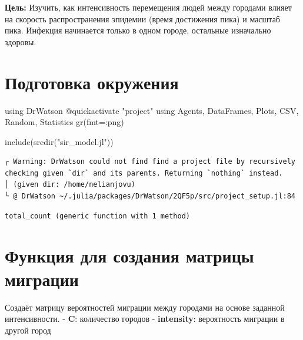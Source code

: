 \documentclass[
  12pt,
  a4paper,
  DIV=11,
  numbers=noendperiod]{scrreprt}
\newenvironment{Shaded}{\begin{snugshade}}{\end{snugshade}}
\newcommand{\BuiltInTok}[1]{\textcolor[rgb]{0.00,0.23,0.31}{#1}}
\newcommand{\FunctionTok}[1]{\textcolor[rgb]{0.28,0.35,0.67}{#1}}
\newcommand{\ImportTok}[1]{\textcolor[rgb]{0.00,0.46,0.62}{#1}}
\newcommand{\NormalTok}[1]{\textcolor[rgb]{0.00,0.23,0.31}{#1}}
\newcommand{\OperatorTok}[1]{\textcolor[rgb]{0.37,0.37,0.37}{#1}}
\newcommand{\PreprocessorTok}[1]{\textcolor[rgb]{0.68,0.00,0.00}{#1}}
\newcommand{\StringTok}[1]{\textcolor[rgb]{0.13,0.47,0.30}{#1}}
\begin{document}
\textbf{Цель:} Изучить, как интенсивность перемещения людей между
городами влияет на скорость распространения эпидемии (время достижения
пика) и масштаб пика. Инфекция начинается только в одном городе,
остальные изначально здоровы.

\section{Подготовка
окружения}\label{ux43fux43eux434ux433ux43eux442ux43eux432ux43aux430-ux43eux43aux440ux443ux436ux435ux43dux438ux44f-1}

\begin{Shaded}
\begin{Highlighting}[]
\ImportTok{using} \BuiltInTok{DrWatson}
\PreprocessorTok{@quickactivate} \StringTok{"project"}
\ImportTok{using} \BuiltInTok{Agents}\NormalTok{, }\BuiltInTok{DataFrames}\NormalTok{, }\BuiltInTok{Plots}\NormalTok{, }\BuiltInTok{CSV}\NormalTok{, }\BuiltInTok{Random}\NormalTok{, }\BuiltInTok{Statistics}
\FunctionTok{gr}\NormalTok{(fmt}\OperatorTok{=:}\NormalTok{png)}

\FunctionTok{include}\NormalTok{(}\FunctionTok{srcdir}\NormalTok{(}\StringTok{"sir\_model.jl"}\NormalTok{))}
\end{Highlighting}
\end{Shaded}

\begin{verbatim}
┌ Warning: DrWatson could not find find a project file by recursively checking given `dir` and its parents. Returning `nothing` instead.
│ (given dir: /home/nelianjovu)
└ @ DrWatson ~/.julia/packages/DrWatson/2QF5p/src/project_setup.jl:84
\end{verbatim}

\begin{verbatim}
total_count (generic function with 1 method)
\end{verbatim}

\section{Функция для создания матрицы
миграции}\label{ux444ux443ux43dux43aux446ux438ux44f-ux434ux43bux44f-ux441ux43eux437ux434ux430ux43dux438ux44f-ux43cux430ux442ux440ux438ux446ux44b-ux43cux438ux433ux440ux430ux446ux438ux438-1}

Создаёт матрицу вероятностей миграции между городами на основе заданной
интенсивности. - \textbf{C}: количество городов - \textbf{intensity}:
вероятность миграции в другой город
\end{document}
